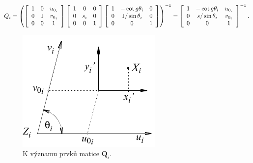 \begin{equation} \label{eq:11_2}
    Q_{i} = \left(
    \left[
    \begin{array}{ccc}
    {1} & {0} & {u_{0_{i} } } \\
    {0} & {1} & {v_{0_{i} } } \\
    {0} & {0} & {1}
    \end{array}
    \right]
    \left[
    \begin{array}{ccc}
    {1} & {0} & {0} \\
    {0} & {s_{i} } & {0} \\
    {0} & {0} & {1}
    \end{array}
    \right]
    \left[
    \begin{array}{ccc}
    {1} & {-\cot g\theta _{i} } & {0} \\
    {0} & {{1 \mathord{\left/{\vphantom{1 \sin \theta _{i} }}\right.\kern-\nulldelimiterspace} \sin \theta _{i} } } & {0} \\
    {0} & {0} & {1}
    \end{array}
    \right]
    \right)^{-1}
    =
    \left[
    \begin{array}{ccc}
    {1} & {-\cot g\theta _{i} } & {u_{0_{i} } } \\
    {0} & {{s \mathord{\left/{\vphantom{s \sin \theta _{i} }}\right.\kern-\nulldelimiterspace} \sin \theta _{i} } } & {v_{0_{i} } } \\
    {0} & {0} & {1}
    \end{array}
    \right]^{-1} .
\end{equation}

\begin{figure}[th]
    \begin{center}
        \includegraphics[scale=.9]{11_stereo/images/img_11_2.pdf}
    \end{center}
    \caption{K významu prvků matice $\mathbf{Q}_i$.}
    \label{img:11_2}
\end{figure}

